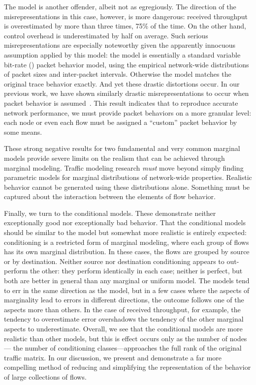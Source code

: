 \documentclass[twocolumn,final]{svjour3}
\begin{document}
The  model is another offender, albeit not as egregiously. The direction of the misrepresentations in this case, however, is more dangerous: received throughput is overestimated by more than three times, 75\% of the time. On the other hand,  control overhead is underestimated by half on average. Such serious misrepresentations are especially noteworthy given the apparently innocuous assumption applied by this model: the  model is essentially a standard variable bit-rate () packet behavior model, using the empirical network-wide distributions of packet sizes and inter-packet intervals. Otherwise the model matches the original trace behavior exactly. And yet these drastic distortions occur. In our previous work, we have shown similarly drastic misrepresentations to occur when  packet behavior is assumed~\cite{Karpinski07:cbr-failure}. This result indicates that to reproduce accurate network performance, we must provide packet behaviors on a more granular level: each node or even each flow must be assigned a ``custom'' packet behavior by some means.

These strong negative results for two fundamental and very common marginal models provide severe limits on the realism that can be achieved through marginal modeling. Traffic modeling research \textit{must} move beyond simply finding parametric models for marginal distributions of network-wide properties. Realistic behavior cannot be generated using these distributions alone. Something must be captured about the interaction between the elements of flow behavior.

Finally, we turn to the conditional models. These demonstrate neither exceptionally good nor exceptionally bad behavior. That the conditional models should be similar to the  model but somewhat more realistic is entirely expected: conditioning is a restricted form of marginal modeling, where each group of flows has its own marginal distribution. In these cases, the flows are grouped by source or by destination.
Neither source nor destination conditioning appears to out-perform the other:
they perform identically in each case;
neither is perfect, but both are better in general than any marginal or uniform model.
The  models tend to err in the same direction as the  model, but in a few cases where the aspects of marginality lead to errors in different directions, the outcome follows one of the aspects more than others.
In the case of received throughput, for example, the  tendency to overestimate error overshadows the tendency of the other marginal aspects to underestimate.
Overall, we see that the conditional models are more realistic than other models, but this is effect occurs only as the number of nodes--- the number of conditioning classes---approaches the full rank of the original traffic matrix.
In our discussion, we present and demonstrate a far more compelling method of reducing and simplifying the representation of the behavior of large collections of flows.
\end{document}
